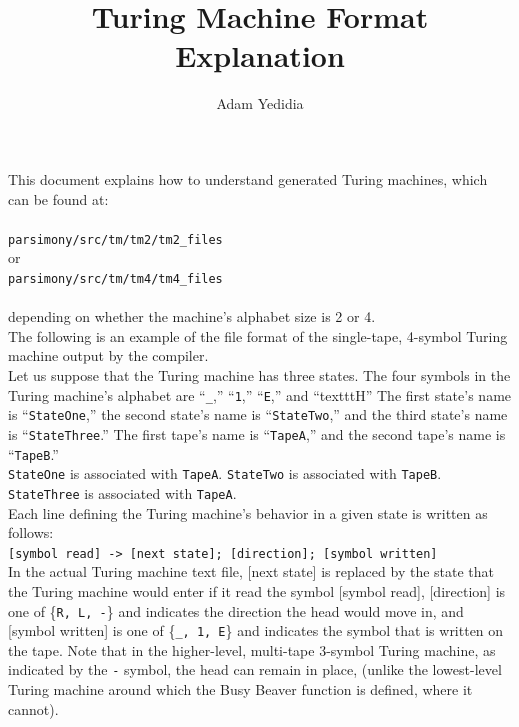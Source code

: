 \documentclass[11pt]{article}
\title{Turing Machine Format Explanation}
\author{Adam Yedidia}
\begin{document}
    
\maketitle

This document explains how to understand generated Turing machines, which can be found at: \\ \\
\texttt{parsimony/src/tm/tm2/tm2_files} \\
or \\
\texttt{parsimony/src/tm/tm4/tm4_files} \\ \\
depending on whether the machine's alphabet size is 2 or 4. \\

The following is an example of the file format of the single-tape, 4-symbol Turing machine output by the compiler. \\

Let us suppose that the Turing machine has three states. The four symbols in the Turing machine's alphabet are ``\texttt{\_},'' ``\texttt{1},'' ``\texttt{E},'' and ``texttt{H}'' The first state's name is ``\texttt{StateOne},'' the second state's name is ``\texttt{StateTwo},'' and the third state's name is ``\texttt{StateThree}.'' The first tape's name is ``\texttt{TapeA},'' and the second tape's name is ``\texttt{TapeB}.'' \\

\texttt{StateOne} is associated with \texttt{TapeA}. \texttt{StateTwo} is associated with \texttt{TapeB}. \texttt{StateThree} is associated with \texttt{TapeA}. \\

Each line defining the Turing machine's behavior in a given state is written as follows: \\

\texttt{[symbol read] -> [next state]; [direction]; [symbol written]} \\

In the actual Turing machine text file, [next state] is replaced by the state that the Turing machine would enter if it read the symbol [symbol read], [direction] is one of \{\texttt{R, L, -}\} and indicates the direction the head would move in, and [symbol written] is one of \{\texttt{\_, 1, E}\} and indicates the symbol that is written on the tape. Note that in the higher-level, multi-tape 3-symbol Turing machine, as indicated by the \texttt{-} symbol, the head can remain in place, (unlike the lowest-level Turing machine around which the Busy Beaver function is defined, where it cannot). \\
\end{document}
